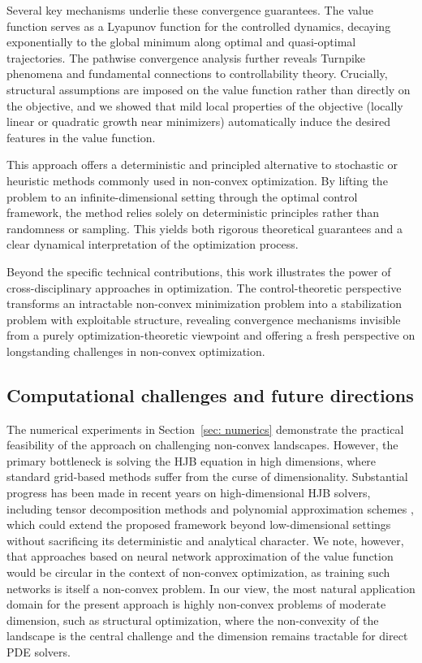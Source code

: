 \documentclass[12pt]{amsart}
\numberwithin{equation}{section}
\theoremstyle{plain}
\begin{document}
Several key mechanisms underlie these convergence guarantees. The value function serves as a Lyapunov function for the controlled dynamics, decaying exponentially to the global minimum along optimal and quasi-optimal trajectories. The pathwise convergence analysis further reveals Turnpike phenomena and fundamental connections to controllability theory. Crucially, structural assumptions are imposed on the value function rather than directly on the objective, and we showed that mild local properties of the objective (locally linear or quadratic growth near minimizers) automatically induce the desired features in the value function.

This approach offers a deterministic and principled alternative to stochastic or heuristic methods commonly used in non-convex optimization. By lifting the problem to an infinite-dimensional setting through the optimal control framework, the method relies solely on deterministic principles rather than randomness or sampling. This yields both rigorous theoretical guarantees and a clear dynamical interpretation of the optimization process.

Beyond the specific technical contributions, this work illustrates the power of cross-disciplinary approaches in optimization. The control-theoretic perspective transforms an intractable non-convex minimization problem into a stabilization problem with exploitable structure, revealing convergence mechanisms invisible from a purely optimization-theoretic viewpoint  and  offering a fresh perspective on longstanding challenges in non-convex optimization.
\subsection*{Computational challenges and future directions}
The numerical experiments in Section~\ref{sec: numerics} demonstrate the practical feasibility of the approach on challenging non-convex landscapes. However, the primary bottleneck is solving the HJB equation in high dimensions, where standard grid-based methods suffer from the curse of dimensionality. Substantial progress has been made in recent years on high-dimensional HJB solvers, including tensor decomposition methods and polynomial approximation schemes \cite{dolgov2021tensor, Kalise_2018}, which could extend the proposed framework beyond low-dimensional settings without sacrificing its deterministic and analytical character. We note, however, that approaches based on neural network approximation of the value function would be circular in the context of non-convex optimization, as training such networks is itself a non-convex problem. In our view, the most natural application domain for the present approach is highly non-convex problems of moderate dimension, such as structural optimization, where the non-convexity of the landscape is the central challenge and the dimension remains tractable for direct PDE solvers.
\end{document}
